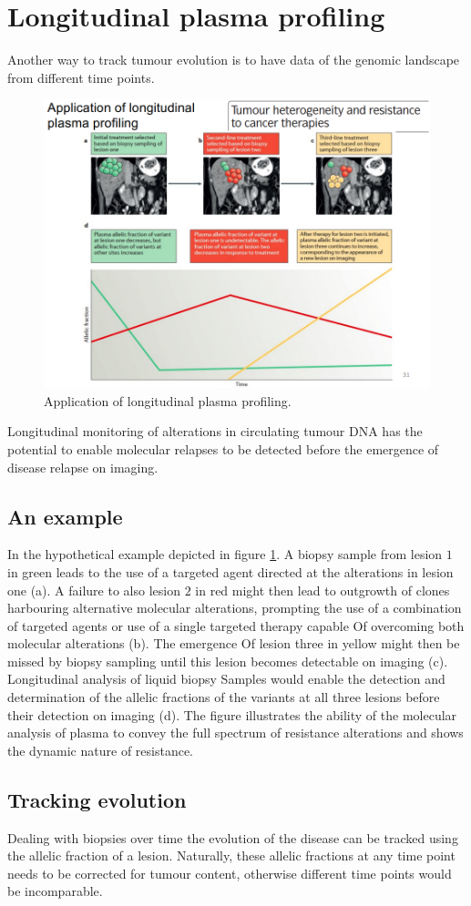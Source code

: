 \section{Longitudinal plasma profiling}
Another way to track tumour evolution is to have data of the genomic landscape from different time points.

  \begin{figure}[H]
    \centering
    \includegraphics[width=0.8\linewidth]{image16.png}
    \caption{Application of longitudinal plasma profiling.}
    \label{fig:img16}
  \end{figure}

Longitudinal monitoring of alterations in circulating tumour DNA has the potential to enable molecular relapses to be detected before the emergence of disease relapse on imaging.

  \subsection{An example}
  In the hypothetical example depicted in figure \ref{fig:img16}.
  A biopsy sample from lesion $1$ in green leads to the use of a targeted agent directed at the alterations in lesion one (a).
  A failure to also lesion $2$ in red might then lead to outgrowth of clones harbouring alternative molecular alterations, prompting the use of a combination of targeted agents or use of a single targeted therapy capable Of overcoming both molecular alterations (b).
  The emergence Of lesion three in yellow might then be missed by biopsy sampling until this lesion becomes detectable on imaging (c).
  Longitudinal analysis of liquid biopsy Samples would enable the detection and determination of the allelic fractions of the variants at all three lesions before their detection on imaging (d).
  The figure illustrates the ability of the molecular analysis of plasma to convey the full spectrum of resistance alterations and shows the dynamic nature of resistance.

  \subsection{Tracking evolution}
  Dealing with biopsies over time the evolution of the disease can be tracked using the allelic fraction of a lesion.
  Naturally, these allelic fractions at any time point needs to be corrected for tumour content, otherwise different time points would be incomparable.

